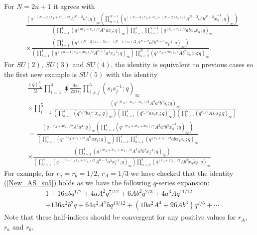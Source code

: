 \documentclass[12pt]{article}
\numberwithin{equation}{section}
\begin{document}
For $N=2n+1$ it agrees with 
\begin{align}
\label{alt_SUN_even_AS_hindexB2}
&
\frac{\left( q^{((N-2)r_A + 4r_a)/2} A^{N-2} a^4; q \right)_{\infty} \left( \prod_{\alpha = 1}^{N-1} \left( q^{((N-3)r_A + 4r_a + (N-2)r_b)/2} A^{N-3} a^4 b^{N-2} \tilde{x}_{\alpha}^{-1};q \right)_{\infty} \right)}
 {\left( \prod_{I = 1}^4 \left( q^{(nr_A + r_a)/2} A^n a x_I; q \right)_{\infty} \right) \prod_{I = 1}^4 \prod_{\alpha = 1}^{N-1} (q^{(r_a + r_b)/2} ab x_I \tilde{x}_{\alpha}; q)_{\infty}}
 \nonumber \\
&\times \frac{\left( \prod_{I = 1}^4 \left( q^{((N-2)r_A + 3r_a + (N-1)r_b)/2} A^{N-2} a^3 b^{N-1} x_I^{-1};q \right)_{\infty} \right)}
 {\left( \prod_{I = 1}^4 \left( q^{((n-1)r_A + 3r_a)/2} A^{n-1} a^3 x_I^{-1}; q \right)_{\infty} \right) \prod_{\alpha < \beta}^{N-1} (q^{(r_A + 2r_b)/2} A b^2 \tilde{x}_{\alpha} \tilde{x}_{\beta}; q)_{\infty}}. 
\end{align}
For $SU(2)$, $SU(3)$ and $SU(4)$, the identity is equivalent to previous cases so the
first new example is $SU(5)$ with the identity
\begin{align}
&
\frac{(q)_{\infty}^{4}}{5!} \prod_{i=1}^{4} \oint \frac{ds_i}{2\pi i s_i}
\prod_{i \ne j}^5 (s_i s_j^{-1}; q)_{\infty} 
\nonumber \\
&\times \prod_{i = 1}^5 \frac{(q^{(3r_A + 4r_a + 4r_b)/2} A^3 a^4 b^4 s_i; q)_{\infty}}{\left( \prod_{\alpha = 1}^4 (q^{r_b/2} b s_i^{-1} \tilde{x}_{\alpha}; q)_{\infty} \right) \left( \prod_{I = 1}^4 (q^{r_a/2} a s_i x_I; q)_{\infty} \right) \left( \prod_{i < j}^5 (q^{r_A/2} A s_i {s_j}; q)_{\infty} \right)}
\nonumber \\
&= 
\frac{\left( q^{(3r_A + 4r_a)/2} A^3 a^4; q \right)_{\infty} \left( \prod_{\alpha = 1}^{4} \left( q^{(2r_A + 4r_a + 3r_b)/2} A^{2} a^4 b^{3} \tilde{x}_{\alpha}^{-1};q \right)_{\infty} \right)}
 {\left( \prod_{I = 1}^4 \left( q^{(nr_A + r_a)/2} A^n a x_I; q \right)_{\infty} \right) \prod_{I = 1}^4 \prod_{\alpha = 1}^{4} (q^{(r_a + r_b)/2} ab x_I \tilde{x}_{\alpha}; q)_{\infty}}
\nonumber \\
&\times \frac{\left( \prod_{I = 1}^4 \left( q^{(3r_A + 3r_a + 4r_b)/2} A^{3} a^3 b^{4} x_I^{-1};q \right)_{\infty} \right)}
 {\left( \prod_{I = 1}^4 \left( q^{((n-1)r_A + 3r_a)/2} A^{n-1} a^3 x_I^{-1}; q \right)_{\infty} \right) \prod_{\alpha < \beta}^{4} (q^{(r_A + 2r_b)/2} A b^2 \tilde{x}_{\alpha} \tilde{x}_{\beta}; q)_{\infty}}
\label{New_AS_su5}
\end{align}
For example, for $r_a=r_b=1/2$, $r_A=1/3$ we have checked that the identity (\ref{New_AS_su5}) holds as we have the following $q$-series expansion: 
\begin{align}
&1+16abq^{1/2}+4aA^2q^{7/12}+6Ab^2q^{2/3}+4a^3Aq^{11/12}
\nonumber\\
&+136a^2b^2q+64a^2A^2bq^{13/12}+
(10a^2A^4+96Ab^3)q^{7/6}+\cdots
\end{align}
Note that these half-indices should be convergent for any positive values for $r_A$, $r_a$ and $r_b$.
\end{document}
